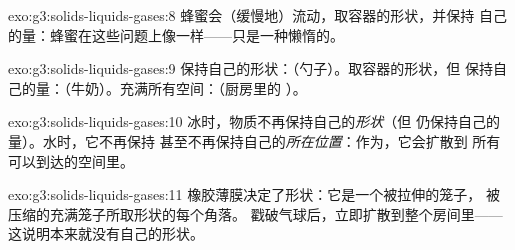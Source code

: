 \begin{solution}{exo:g3:solids-liquids-gases:8}
蜂蜜会（缓慢地）流动，取容器的形状，并保持
自己的量：蜂蜜在这些问题上像一样——只是一种懒惰的。
\end{solution}

\begin{solution}{exo:g3:solids-liquids-gases:9}
保持自己的形状：（勺子）。取容器的形状，但
保持自己的量：（牛奶）。充满所有空间：（厨房里的
）。
\end{solution}

\begin{solution}{exo:g3:solids-liquids-gases:10}
冰时，物质不再保持自己的\emph{形状}（但
仍保持自己的量）。水时，它不再保持
甚至不再保持自己的\emph{所在位置}：作为，它会扩散到
所有可以到达的空间里。
\end{solution}

\begin{solution}{exo:g3:solids-liquids-gases:11}
橡胶薄膜决定了形状：它是一个被拉伸的笼子，
被压缩的充满笼子所取形状的每个角落。
戳破气球后，立即扩散到整个房间里——
这说明本来就没有自己的形状。
\end{solution}
